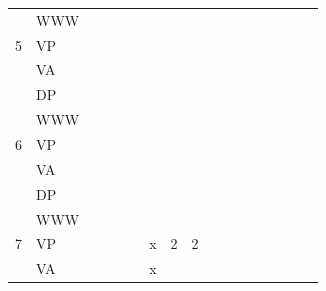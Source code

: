 \documentclass[FP,DP]{tulthesis}
\begin{document}
{{{{{{{\begin{table}[]
\begin{tabular}{@{}|C{0.5cm}|C{1cm}|C{0.7cm}|C{0.6cm}|C{0.6cm}|C{0.7cm}|C{0.7cm}|C{0.6cm}|C{0.6cm}|C{0.6cm}|C{0.7cm}|C{0.7cm}|C{0.7cm}|C{0.7cm}|C{0.7cm}|C{0.7cm}|C{0.7cm}|@{}}
  & WWW &         &        &       &        &         &           &           &            &            &          &        &         &        &         &      \\    
5 & VP  &         &        &       &        &         &           &           &            &            &          &        &         &        &         &          \\
  & VA  &         &        &       &        &         &           &           &            &            &          &        &         &        &         &          \\
  & DP  &         &        &       &        &         &           &           &            &            &          &        &         &        &         &          \\
  & WWW &         &        &       &        &         &           &           &            &            &          &        &         &        &         &      \\   
6 & VP  &         &        &       &        &         &           &            &            &            &          &        &         &        &         &          \\
  & VA  &         &        &       &        &         &           &           &            &            &          &        &         &        &         &          \\
  & DP  &         &        &       &        &         &           &           &            &            &          &        &         &        &         &          \\
  & WWW &         &        &       &        &         &           &           &            &            &          &        &         &        &         &      \\    
7 & VP  &         &        &       &        &  x       &  2         &   2        &            &            &          &        &         &        &         &          \\
  & VA  &         &        &       &        & x        &           &           &            &             &           &        &         &           &         &          \\

\end{tabular}
\end{table}}}}}}}}
\end{document}

